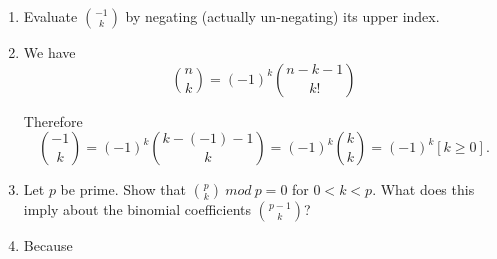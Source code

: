 \documentclass[12pt,a4paper]{article}
\makeatletter
\newtheorem*{solution}{Solution}
\theoremstyle{definition}
\renewenvironment{solution}[1][Solution] {\par\pushQED{\qed}\normalfont\topsep6\p@\@plus6\p@\relax\trivlist\item[\hskip\labelsep\bfseries#1\@addpunct{.}]\ignorespaces}{\popQED\endtrivlist\@endpefalse} \makeatother
\makeatother
\begin{document}
\begin{enumerate}
        \begin{proof}
        	\begin{equation*}
        	    \binom{n-1}{k-1}\binom{n}{k+1}\binom{n+1}{k}
        	\end{equation*}
        	\begin{equation*}
        	    =\frac{(n-1)^{\underline{k-1}}}{(k-1)!}\times\frac{n^{\underline{k+1}}}{(k+1)!}\times\frac{(n+1)^{\underline{k}}}{k!}
        	\end{equation*}
        	\begin{equation*}
        	    =\frac{(n-1)(n-2)\cdots(n-k+1)}{(k-1)!}\times\frac{n(n-1)(n-2)\cdots(n-k)}{(k+1)!}\times\frac{(n+1)n\cdots(n-k+2)}{k!}
        	\end{equation*}
        	\begin{equation*}
        	    =\frac{n(n-1)(n-2)\cdots(n-k)}{(k-1)!}\times\frac{(n-1)(n-2)\cdots(n-k)}{k!}\times\frac{(n+1)n(n-1)\cdots(n-k+2)(n-k+1)}{(k+1)!}
        	\end{equation*}
        	\begin{equation*}
        	    =\frac{n^{\underline{k-1}}}{(k-1)!}\times\frac{(n-1)^{\underline{k}}}{k!}\times\frac{(n+1)^{\underline{k+1}}}{(k+1)!}
        	\end{equation*}
        	\begin{equation*}
        	    =\binom{n-1}{k}\binom{n+1}{k+1}\binom{n}{k-1}
        	\end{equation*}
        	
        \end{proof}
    \item 
        Evaluate $\binom{-1}{k}$ by negating (actually un-negating) its upper index.
        \begin{solution}
        	We have 
        	\begin{equation*}
        	    \binom{n}{k}=(-1)^k\binom{n-k-1}{k!}
        	\end{equation*}
        	
        	Therefore
        	\begin{equation*}
        	    \binom{-1}{k}=(-1)^k\binom{k-(-1)-1}{k}=(-1)^k\binom{k}{k}=(-1)^k[k\ge 0].
        	\end{equation*}
        \end{solution}
    \item 
        Let $p$ be prime. Show that $\binom{p}{k}\ mod\ p=0$ for $0<k<p$. What does this imply about the binomial coefficients $\binom{p-1}{k}$?
        \begin{solution}
        	Because
        	

\end{solution}
\end{enumerate}
\end{document}
